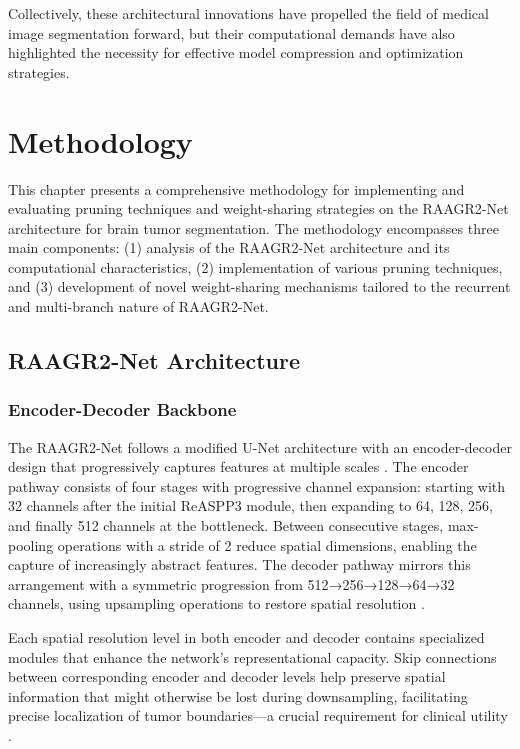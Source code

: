 \documentclass[12pt,a4paper]{article}
\begin{document}
Collectively, these architectural innovations have propelled the field of medical image segmentation forward, but their computational demands have also highlighted the necessity for effective model compression and optimization strategies.

\section{Methodology}

This chapter presents a comprehensive methodology for implementing and evaluating pruning techniques and weight-sharing strategies on the RAAGR2-Net architecture for brain tumor segmentation. The methodology encompasses three main components: (1) analysis of the RAAGR2-Net architecture and its computational characteristics, (2) implementation of various pruning techniques, and (3) development of novel weight-sharing mechanisms tailored to the recurrent and multi-branch nature of RAAGR2-Net.

\subsection{RAAGR2-Net Architecture}

\subsubsection{Encoder-Decoder Backbone}

The RAAGR2-Net follows a modified U-Net architecture with an encoder-decoder design that progressively captures features at multiple scales \cite{Rehman2023RAAGR2}. The encoder pathway consists of four stages with progressive channel expansion: starting with 32 channels after the initial ReASPP3 module, then expanding to 64, 128, 256, and finally 512 channels at the bottleneck. Between consecutive stages, max-pooling operations with a stride of 2 reduce spatial dimensions, enabling the capture of increasingly abstract features. The decoder pathway mirrors this arrangement with a symmetric progression from 512→256→128→64→32 channels, using upsampling operations to restore spatial resolution \cite{Alom2019R2UNet}.

Each spatial resolution level in both encoder and decoder contains specialized modules that enhance the network's representational capacity. Skip connections between corresponding encoder and decoder levels help preserve spatial information that might otherwise be lost during downsampling, facilitating precise localization of tumor boundaries—a crucial requirement for clinical utility \cite{Rehman2023RAAGR2}.
\end{document}
